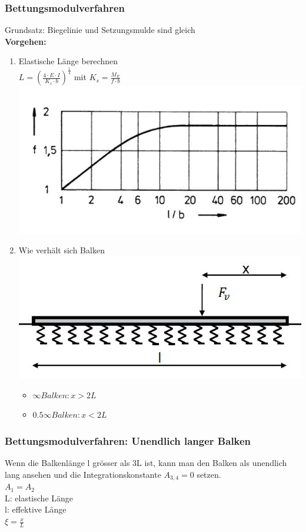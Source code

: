 \begin{multicols}{2}
	\subsubsection{Bettungsmodulverfahren}
	Grundsatz: Biegelinie und Setzungsmulde sind gleich\\
	\textbf{Vorgehen:}
	\begin{enumerate}
		\item 
		Elastische Länge berechnen\\
		$L=(\frac{4\cdot E\cdot I}{K_s\cdot b})^\frac{1}{4}$ mit $K_s=\frac{M_E}{f\cdot b}$\\
		\includegraphics[width=1.0\linewidth]{images/f}
		\item 
		Wie verhält sich Balken\\
		\includegraphics[width=1.0\linewidth]{images/Balken}
		\begin{itemize}
			
			\item 
			$\infty Balken : x > 2L$
			\item 
			$0.5 \infty  Balken: x < 2L$
			
		\end{itemize}
	\end{enumerate}
	\subsubsection{Bettungsmodulverfahren: Unendlich langer Balken}
	Wenn die Balkenlänge l grösser als 3L ist, kann man den Balken als unendlich lang ansehen und die Integrationskonstante $A_{3,4} = 0$ setzen.\\
	$A_1=A_2$\\
	L: elastische Länge\\
	l: effektive Länge\\
	$\xi=\frac{x}{L}$
	

\end{multicols}
